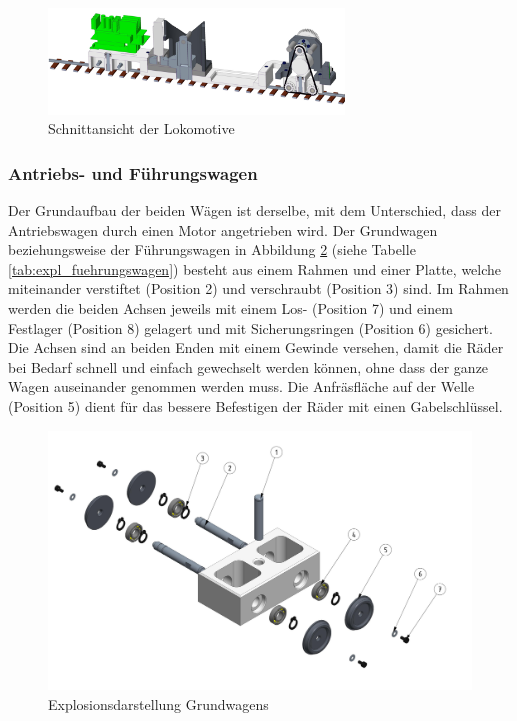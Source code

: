 \documentclass[../../main.tex]{subfiles}
\begin{document}
    \begin{figure}[H] %
        \centering
        \includegraphics[width=0.7\textwidth]{lokomotive_2.png}
        \caption{Schnittansicht der Lokomotive}
        \label{fig:schnitt_lokomotive}
    \end{figure}
    \newpage

    \subsubsection{Antriebs- und Führungswagen}
    Der Grundaufbau der beiden Wägen ist derselbe, mit dem Unterschied, dass der Antriebswagen durch einen Motor angetrieben wird. Der Grundwagen beziehungsweise der Führungswagen in Abbildung \ref{fig:expl_fuehrungswagen} (siehe Tabelle \ref{tab:expl_fuehrungswagen}) besteht aus einem Rahmen und einer Platte, welche miteinander verstiftet (Position 2) und verschraubt (Position 3) sind. Im Rahmen werden die beiden Achsen jeweils mit einem Los- (Position 7) und einem Festlager (Position 8) gelagert und mit Sicherungsringen (Position 6) gesichert. Die Achsen sind an beiden Enden mit einem Gewinde versehen, damit die Räder bei Bedarf schnell und einfach gewechselt werden können, ohne dass der ganze Wagen auseinander genommen werden muss. Die Anfräsfläche auf der Welle (Position 5) dient für das bessere Befestigen der Räder mit einen Gabelschlüssel.\\

     \begin{figure}[H] %
        \centering
        \includegraphics[width=1\textwidth]{Fuehrungswagen.png}
        \caption{Explosionsdarstellung Grundwagens}
        \label{fig:expl_fuehrungswagen}
    \end{figure}
\end{document}
